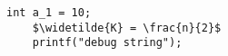 \documentclass{article}
\begin{document}
\begin{lstlisting}[mathescape=true]
    int a_1 = 10;
    $\widetilde{K} = \frac{n}{2}$
    printf("debug string");
\end{lstlisting}


\end{document}

